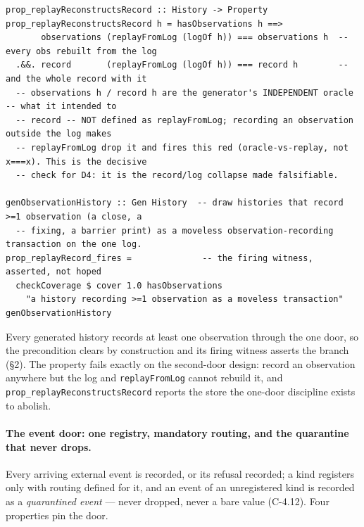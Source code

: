 \documentclass[11pt,a4paper]{article}
\begin{document}
\begin{lstlisting}
prop_replayReconstructsRecord :: History -> Property
prop_replayReconstructsRecord h = hasObservations h ==>
       observations (replayFromLog (logOf h)) === observations h  -- every obs rebuilt from the log
  .&&. record       (replayFromLog (logOf h)) === record h        -- and the whole record with it
  -- observations h / record h are the generator's INDEPENDENT oracle -- what it intended to
  -- record -- NOT defined as replayFromLog; recording an observation outside the log makes
  -- replayFromLog drop it and fires this red (oracle-vs-replay, not x===x). This is the decisive
  -- check for D4: it is the record/log collapse made falsifiable.

genObservationHistory :: Gen History  -- draw histories that record >=1 observation (a close, a
  -- fixing, a barrier print) as a moveless observation-recording transaction on the one log.
prop_replayRecord_fires =              -- the firing witness, asserted, not hoped
  checkCoverage $ cover 1.0 hasObservations
    "a history recording >=1 observation as a moveless transaction" genObservationHistory
\end{lstlisting}

Every generated history records at least one observation through the one door, so the precondition
clears by construction and its firing witness asserts the branch (\S 2). The property fails exactly
on the second-door design: record an observation
anywhere but the log and \texttt{replayFromLog} cannot rebuild it, and
\texttt{prop\_replayReconstructsRecord} reports the store the one-door discipline exists to abolish.

\paragraph{The event door: one registry, mandatory routing, and the quarantine that never drops.}
Every arriving external event is recorded, or its refusal recorded; a kind registers only with
routing defined for it, and an event of an unregistered kind is recorded as a \emph{quarantined
event} --- never dropped, never a bare value (C-4.12). Four properties pin the door.
\end{document}
